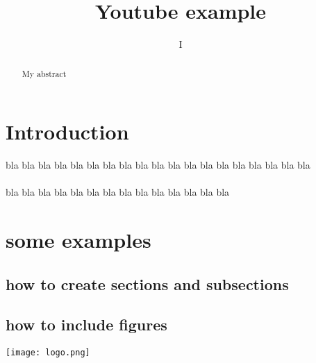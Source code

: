 \documentclass{article}
\title{Youtube example}
\author{I}
\begin{document}
\maketitle
\begin{abstract}
    My abstract
\end{abstract}

\section{Introduction}
bla bla bla bla bla bla bla bla bla bla bla bla bla bla bla bla bla bla bla\\
\\
bla bla bla bla bla bla bla bla bla bla bla bla bla bla
\section{some examples}
\subsection{how to create sections and subsections}
\subsection{how to include figures}
\texttt{[image: logo.png]}
\end{document}
